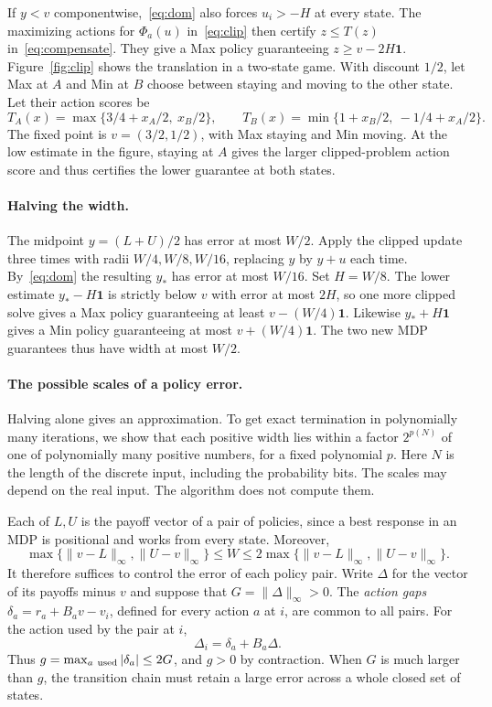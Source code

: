 If \(y<v\) componentwise,~\eqref{eq:dom} also forces \(u_i>-H\) at
every state. The maximizing actions for \(\Phi_a(u)\) in~\eqref{eq:clip}
then certify \(z\le T(z)\) in~\eqref{eq:compensate}. They give a Max
policy guaranteeing \(z\ge v-2H\mathbf1\). Figure~\ref{fig:clip}
shows the translation in a two-state game. With discount \(1/2\),
let Max at \(A\) and Min at \(B\) choose between staying and moving
to the other state. Let their action scores be
\[
 T_A(x)=\max\{3/4+x_A/2,\ x_B/2\},\qquad
 T_B(x)=\min\{1+x_B/2,\ -1/4+x_A/2\}.
\]
The fixed point is \(v=(3/2,1/2)\), with Max staying and Min moving.
At the low estimate in the figure, staying at \(A\) gives the larger
clipped-problem action score and thus certifies the lower guarantee
at both states.



\paragraph{Halving the width.}
The midpoint \(y=(L+U)/2\) has error at most \(W/2\). Apply the
clipped update three times with radii \(W/4,W/8,W/16\), replacing
\(y\) by \(y+u\) each time. By~\eqref{eq:dom} the resulting
\(y_*\) has error at most \(W/16\). Set \(H=W/8\). The lower estimate
\(y_*-H\mathbf1\) is strictly below \(v\) with error at most \(2H\),
so one more clipped solve gives a Max policy guaranteeing at least
\(v-(W/4)\mathbf1\). Likewise \(y_*+H\mathbf1\) gives a Min policy
guaranteeing at most \(v+(W/4)\mathbf1\). The two new MDP guarantees
thus have width at most \(W/2\).

\paragraph{The possible scales of a policy error.}
Halving alone gives an approximation. To get exact termination in
polynomially many iterations, we show that each positive width lies
within a factor \(2^{p(N)}\) of one of polynomially many positive
numbers, for a fixed polynomial \(p\). Here \(N\) is the length of the
discrete input, including the probability bits. The scales may depend
on the real input. The algorithm does not compute them.

Each of \(L,U\) is the payoff vector of a pair of policies, since a
best response in an MDP is positional and works from every state.
Moreover,
\[
   \max\{\|v-L\|_\infty,\|U-v\|_\infty\}\le W
      \le 2\max\{\|v-L\|_\infty,\|U-v\|_\infty\}.
\]
It therefore suffices to control the error of each policy pair. Write
\(\Delta\) for the vector of its payoffs minus \(v\) and suppose that
\(G=\|\Delta\|_\infty>0\). The \emph{action gaps}
\(\delta_a=r_a+B_a v-v_i\), defined for every action \(a\) at \(i\),
are common to all pairs. For the action used by the pair at \(i\),
\[
     \Delta_i=\delta_a+B_a\Delta .
\]
Thus \(g=\max_{a\ {\rm used}}|\delta_a|\le 2G\), and \(g>0\) by
contraction. When \(G\) is much larger than \(g\), the transition
chain must retain a large error across a whole closed set of states.

